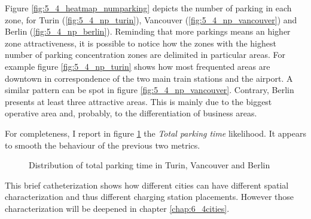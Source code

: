 Figure \ref{fig:5_4_heatmap_numparking} depicts the number of parking in each zone, for Turin (\ref{fig:5_4_np_turin}), Vancouver (\ref{fig:5_4_np_vancouver}) and Berlin (\ref{fig:5_4_np_berlin}). Reminding that more parkings means an higher zone attractiveness,
 it is possible to notice how the zones with the highest number of parking concentration zones are delimited in particular areas. For example figure \ref{fig:5_4_np_turin} shows how most frequented areas are downtown in correspondence of the two main train stations and the airport. A similar pattern can be spot in figure \ref{fig:5_4_np_vancouver}. Contrary, Berlin presents at least three attractive areas. This is mainly due to the biggest operative area and, probably, to the differentiation of business areas.
 
For completeness, I report in figure \ref{fig:5_4_heatmap_sumtime} the \textit{Total parking time} likelihood. It appears to smooth the behaviour of the previous two metrics.

\begin{figure}[th]
	\centering     %
	\quad
	\quad
	\caption{Distribution of total parking time in Turin, Vancouver and Berlin}
	\label{fig:5_4_heatmap_sumtime}
\end{figure} 

This brief catheterization shows how  different cities can have different spatial characterization and thus different charging station placements. However those characterization will be deepened in chapter \ref{chap:6_4cities}.
